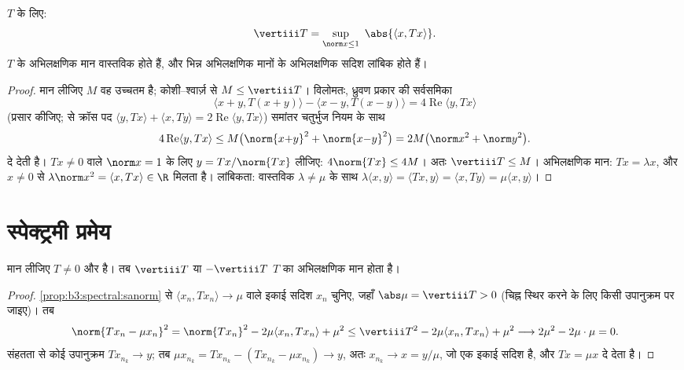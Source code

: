 \begin{proposition}\label{prop:b3:spectral:sanorm}
 $T$ के लिए:
\[
\vertiii T = \sup_{\norm x \leq 1}\ \abs{\langle x,
Tx\rangle} .
\]
$T$ के अभिलक्षणिक मान वास्तविक होते हैं, और भिन्न अभिलक्षणिक
मानों के अभिलक्षणिक सदिश लांबिक होते हैं।
\end{proposition}

\begin{proof}
मान लीजिए $M$ वह उच्चतम है; कोशी--श्वार्ज़ से $M \leq \vertiii T$। विलोमतः,
ध्रुवण प्रकार की सर्वसमिका
\[
\langle x{+}y, T(x{+}y)\rangle - \langle x{-}y,
T(x{-}y)\rangle = 4\operatorname{Re}\langle y, Tx\rangle
\]
(प्रसार कीजिए;  से क्रॉस पद $\langle y, Tx\rangle + \langle x,
Ty\rangle = 2\operatorname{Re}\langle y, Tx\rangle$) समांतर चतुर्भुज नियम
के साथ
\[
4\operatorname{Re}\langle y, Tx\rangle \leq
M\bigl(\norm{x{+}y}^2 + \norm{x{-}y}^2\bigr) = 2M\bigl(\norm
x^2 + \norm y^2\bigr).
\]
दे देती है। $Tx \neq 0$ वाले $\norm x = 1$ के लिए $y = Tx/\norm{Tx}$ लीजिए: $4\norm{Tx} \leq 4M$। अतः $\vertiii T \leq M$।
अभिलक्षणिक मान: $Tx = \lambda x$, और $x \ne 0$ से $\lambda\norm x^2 = \langle
x, Tx\rangle \in \R$ मिलता है। लांबिकता:
वास्तविक $\lambda \neq \mu$ के साथ $\lambda\langle x,
y\rangle = \langle Tx, y\rangle = \langle x, Ty\rangle =
\mu\langle x, y\rangle$।
\end{proof}

\section{स्पेक्ट्रमी प्रमेय}

\begin{lemma}[किसी चरम अभिलक्षणिक मान का अस्तित्व]
\label{lem:b3:spectral:existence}
मान लीजिए $T \neq 0$  और  है। तब $\vertiii T$ या $-\vertiii T$ $T$ का
अभिलक्षणिक मान होता है।
\end{lemma}

\begin{proof}
\cref{prop:b3:spectral:sanorm} से $\langle x_n, Tx_n\rangle \to \mu$ वाले इकाई सदिश $x_n$ चुनिए, जहाँ $\abs\mu =
\vertiii T > 0$ (चिह्न स्थिर
करने के लिए किसी उपानुक्रम पर जाइए)। तब
\[
\norm{Tx_n - \mu x_n}^2
= \norm{Tx_n}^2 - 2\mu\langle x_n, Tx_n\rangle + \mu^2
\leq \vertiii T^2 - 2\mu\langle x_n, Tx_n\rangle + \mu^2
\longrightarrow 2\mu^2 - 2\mu\cdot\mu = 0 .
\]
संहतता से कोई उपानुक्रम $Tx_{n_k} \to y$; तब $\mu
x_{n_k} = Tx_{n_k} - (Tx_{n_k} - \mu x_{n_k}) \to y$, अतः $x_{n_k} \to x = y/\mu$, जो एक इकाई सदिश
है, और  $Tx = \mu x$ दे देता है।
\end{proof}

